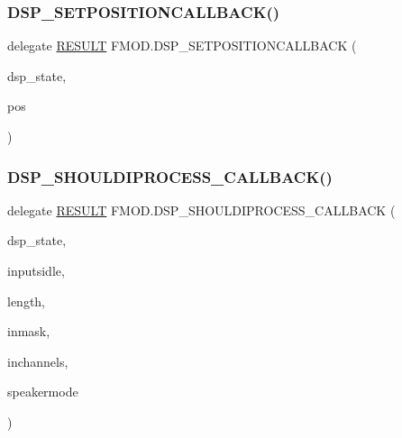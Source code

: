 \subsubsection{\texorpdfstring{D\+S\+P\+\_\+\+S\+E\+T\+P\+O\+S\+I\+T\+I\+O\+N\+C\+A\+L\+L\+B\+A\+C\+K()}{DSP\_SETPOSITIONCALLBACK()}}
{\footnotesize\ttfamily delegate \hyperlink{namespace_f_m_o_d_a305d1176ef3f8c8815861a60407ac33d}{R\+E\+S\+U\+LT} F\+M\+O\+D.\+D\+S\+P\+\_\+\+S\+E\+T\+P\+O\+S\+I\+T\+I\+O\+N\+C\+A\+L\+L\+B\+A\+CK (\begin{DoxyParamCaption}\item[{ref \hyperlink{struct_f_m_o_d_1_1_d_s_p___s_t_a_t_e}{D\+S\+P\+\_\+\+S\+T\+A\+TE}}]{dsp\+\_\+state,  }\item[{uint}]{pos }\end{DoxyParamCaption})}

\mbox{\label{namespace_f_m_o_d_a20f7f3a049e0fa5d089b0cfd44b348b5}} 
\subsubsection{\texorpdfstring{D\+S\+P\+\_\+\+S\+H\+O\+U\+L\+D\+I\+P\+R\+O\+C\+E\+S\+S\+\_\+\+C\+A\+L\+L\+B\+A\+C\+K()}{DSP\_SHOULDIPROCESS\_CALLBACK()}}
{\footnotesize\ttfamily delegate \hyperlink{namespace_f_m_o_d_a305d1176ef3f8c8815861a60407ac33d}{R\+E\+S\+U\+LT} F\+M\+O\+D.\+D\+S\+P\+\_\+\+S\+H\+O\+U\+L\+D\+I\+P\+R\+O\+C\+E\+S\+S\+\_\+\+C\+A\+L\+L\+B\+A\+CK (\begin{DoxyParamCaption}\item[{ref \hyperlink{struct_f_m_o_d_1_1_d_s_p___s_t_a_t_e}{D\+S\+P\+\_\+\+S\+T\+A\+TE}}]{dsp\+\_\+state,  }\item[{bool}]{inputsidle,  }\item[{uint}]{length,  }\item[{\hyperlink{namespace_f_m_o_d_ae295945ff00acb5f2e5ef0b3f217f5e2}{C\+H\+A\+N\+N\+E\+L\+M\+A\+SK}}]{inmask,  }\item[{int}]{inchannels,  }\item[{\hyperlink{namespace_f_m_o_d_aa0732e7e8efd3b96b526a7f2f8479634}{S\+P\+E\+A\+K\+E\+R\+M\+O\+DE}}]{speakermode }\end{DoxyParamCaption})}

